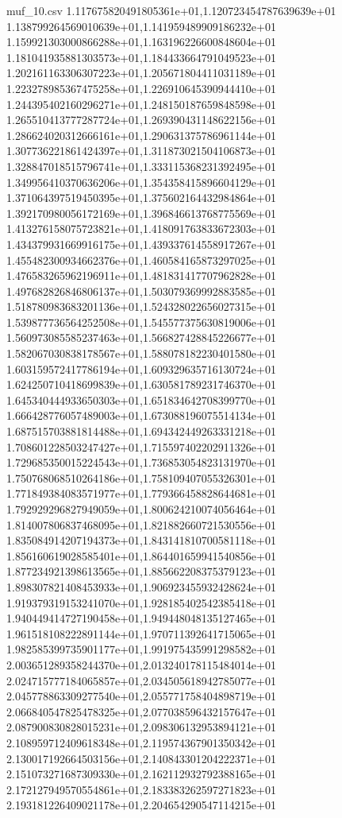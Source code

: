 \begin{filecontents*}{muf_10.csv}
1.117675820491805361e+01,1.120723454787639639e+01
1.138799264569010639e+01,1.141959489909186232e+01
1.159921303000866288e+01,1.163196226600848604e+01
1.181041935881303573e+01,1.184433664791049523e+01
1.202161163306307223e+01,1.205671804411031189e+01
1.223278985367475258e+01,1.226910645390944410e+01
1.244395402160296271e+01,1.248150187659848598e+01
1.265510413777287724e+01,1.269390431148622156e+01
1.286624020312666161e+01,1.290631375786961144e+01
1.307736221861424397e+01,1.311873021504106873e+01
1.328847018515796741e+01,1.333115368231392495e+01
1.349956410370636206e+01,1.354358415896604129e+01
1.371064397519450395e+01,1.375602164432984864e+01
1.392170980056172169e+01,1.396846613768775569e+01
1.413276158075723821e+01,1.418091763833672303e+01
1.434379931669916175e+01,1.439337614558917267e+01
1.455482300934662376e+01,1.460584165873297025e+01
1.476583265962196911e+01,1.481831417707962828e+01
1.497682826846806137e+01,1.503079369992883585e+01
1.518780983683201136e+01,1.524328022656027315e+01
1.539877736564252508e+01,1.545577375630819006e+01
1.560973085585237463e+01,1.566827428845226677e+01
1.582067030838178567e+01,1.588078182230401580e+01
1.603159572417786194e+01,1.609329635716130724e+01
1.624250710418699839e+01,1.630581789231746370e+01
1.645340444933650303e+01,1.651834642708399770e+01
1.666428776057489003e+01,1.673088196075514134e+01
1.687515703881814488e+01,1.694342449263331218e+01
1.708601228503247427e+01,1.715597402202911326e+01
1.729685350015224543e+01,1.736853054823131970e+01
1.750768068510264186e+01,1.758109407055326301e+01
1.771849384083571977e+01,1.779366458828644681e+01
1.792929296827949059e+01,1.800624210074056464e+01
1.814007806837468095e+01,1.821882660721530556e+01
1.835084914207194373e+01,1.843141810700581118e+01
1.856160619028585401e+01,1.864401659941540856e+01
1.877234921398613565e+01,1.885662208375379123e+01
1.898307821408453933e+01,1.906923455932428624e+01
1.919379319153241070e+01,1.928185402542385418e+01
1.940449414727190458e+01,1.949448048135127465e+01
1.961518108222891144e+01,1.970711392641715065e+01
1.982585399735901177e+01,1.991975435991298582e+01
2.003651289358244370e+01,2.013240178115484014e+01
2.024715777184065857e+01,2.034505618942785077e+01
2.045778863309277540e+01,2.055771758404898719e+01
2.066840547825478325e+01,2.077038596432157647e+01
2.087900830828015231e+01,2.098306132953894121e+01
2.108959712409618348e+01,2.119574367901350342e+01
2.130017192664503156e+01,2.140843301204222371e+01
2.151073271687309330e+01,2.162112932792388165e+01
2.172127949570554861e+01,2.183383262597271823e+01
2.193181226409021178e+01,2.204654290547114215e+01

\end{filecontents*}
